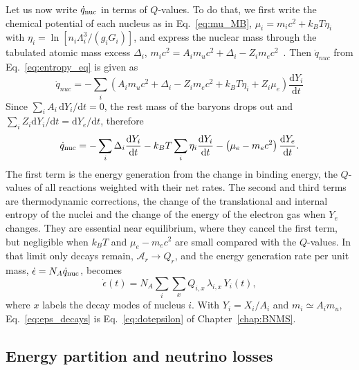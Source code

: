 Let us now write $\dot q_{\rm nuc}$ in terms of $Q$-values.
To do that, we first write the chemical potential of each nucleus as in Eq.~\ref{eq:mu_MB}, $\mu_i=m_ic^2+k_BT\eta_i$ with $\eta_i=\ln[n_i\Lambda_i^3/(g_iG_i)]$, and express the nuclear mass through the tabulated atomic mass excess $\Delta_i$, $m_ic^2=A_im_uc^2+\Delta_i-Z_im_ec^2$~\cite{reichert_nuclear_2023}.
Then $\dot q_{nuc}$ from Eq.~\ref{eq:entropy_eq} is given as
\begin{equation}
  \dot q_{nuc}=-\sum_i\left(A_im_uc^2+\Delta_i-Z_im_ec^2+k_BT\eta_i+Z_i\mu_e\right)\frac{\mathrm {d}Y_i}{\mathrm{d}t}
\end{equation}
Since $\sum_iA_i\,\mathrm{d}Y_i/\mathrm{d}t=0$, the rest mass of the baryons drops out and $\sum_iZ_i\mathrm{d}Y_i/\mathrm{d}t=\mathrm{d}Y_e/\mathrm{d}t$, therefore
\begin{equation}\label{eq:qnuc_decomposition}
  \dot q_{\rm nuc}=-\sum_i\Delta_i\frac{\mathrm{d}Y_i}{\mathrm{d}t}-k_BT\sum_i\eta_i\frac{\mathrm{d}Y_i}{\mathrm{d}t}-\left(\mu_e-m_ec^2\right)\frac{\mathrm{d}Y_e}{\mathrm{d}t}.
\end{equation}
The first term is the energy generation from the change in binding energy, the $Q$-values of all reactions weighted with their net rates.
The second and third terms are thermodynamic corrections, the change of the translational and internal entropy of the nuclei and the change of the energy of the electron gas when $Y_e$ changes.
They are essential near equilibrium, where they cancel the first term, but negligible when $k_BT$ and $\mu_e-m_ec^2$ are small compared with the $Q$-values.
In that limit only decays remain, $\mathcal{A}_r\to Q_r$, and the energy generation rate per unit mass, $\dot\epsilon=N_A\dot q_{\rm nuc}$, becomes
\begin{equation}\label{eq:eps_decays}
  \dot\epsilon(t)=N_A\sum_i\sum_xQ_{i,x}\,\lambda_{i,x}\,Y_i(t),
\end{equation}
where $x$ labels the decay modes of nucleus $i$.
With $Y_i=X_i/A_i$ and $m_i\simeq A_im_u$, Eq.~\ref{eq:eps_decays} is Eq.~\ref{eq:dotepsilon} of Chapter~\ref{chap:BNMS}.

\subsection{Energy partition and neutrino losses}\label{sec:partition}

